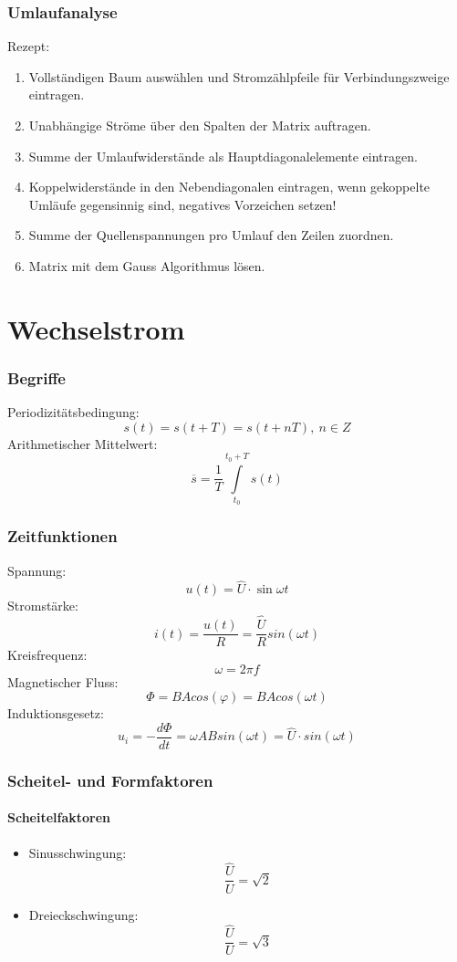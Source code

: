\documentclass[12pt,a4paper]{article}
\begin{document}
\section{Umlaufanalyse}
Rezept:
\begin{enumerate}
\item
Vollständigen Baum auswählen und Stromzählpfeile für Verbindungszweige eintragen.
\item
Unabhängige Ströme über den Spalten der Matrix auftragen.
\item
Summe der Umlaufwiderstände als Hauptdiagonalelemente eintragen.
\item
Koppelwiderstände in den Nebendiagonalen eintragen, wenn gekoppelte Umläufe gegensinnig sind, negatives Vorzeichen setzen!
\item
Summe der Quellenspannungen pro Umlauf den Zeilen zuordnen.
\item
Matrix mit dem Gauss Algorithmus lösen.
\end{enumerate}

\part{Wechselstrom}
\section{Begriffe}
Periodizitätsbedingung: 
\[s(t) = s(t+T) = s(t+nT),\ n \in Z\]
Arithmetischer Mittelwert: 
\[\overline{s} = \frac{1}{T} \int\limits_{t_0}^{t_0+T}s(t)\]

\section{Zeitfunktionen}
Spannung:
\[u(t) = \hat{U} \cdot \sin\omega t\]
Stromstärke:
\[i(t) = \frac{u(t)}{R} = \frac{\hat{U}}{R}sin(\omega t)\]
Kreisfrequenz:
\[\omega = 2\pi f\]
Magnetischer Fluss:
\[\Phi = BAcos(\varphi) = BAcos(\omega t)\]
Induktionsgesetz:
\[u_i = -\frac{d\Phi}{dt} = \omega ABsin(\omega t) = \hat{U}\cdot sin(\omega t)\]

\section{Scheitel- und Formfaktoren}
\subsection{Scheitelfaktoren}
\begin{itemize}
\item Sinusschwingung: 
\[\frac{\hat{U}}{U} = \sqrt{2}\]
\item Dreieckschwingung: 
\[\frac{\hat{U}}{U} = \sqrt{3}\]
\end{itemize}
\end{document}
